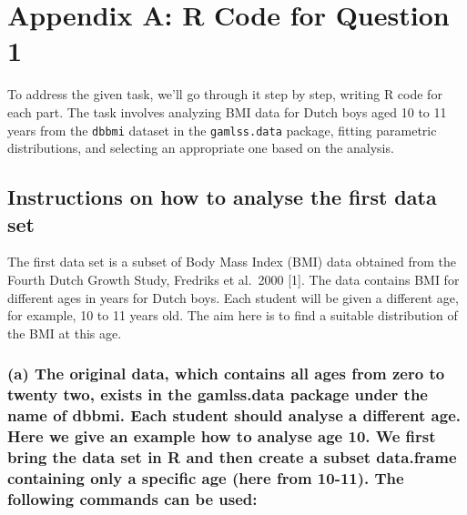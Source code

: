 \section{Appendix A: R Code for Question 1}

To address the given task, we'll go through it step by step, writing R
code for each part. The task involves analyzing BMI data for Dutch boys
aged 10 to 11 years from the \texttt{dbbmi} dataset in the
\texttt{gamlss.data} package, fitting parametric distributions, and
selecting an appropriate one based on the analysis.

\hypertarget{instructions-on-how-to-analyse-the-first-data-set}{%
\subsection{Instructions on how to analyse the first data
set}\label{instructions-on-how-to-analyse-the-first-data-set}}

The first data set is a subset of Body Mass Index (BMI) data obtained
from the Fourth Dutch Growth Study, Fredriks et al.~2000 {[}1{]}. The
data contains BMI for different ages in years for Dutch boys. Each
student will be given a different age, for example, 10 to 11 years old.
The aim here is to find a suitable distribution of the BMI at this age.

\hypertarget{a-the-original-data-which-contains-all-ages-from-zero-to-twenty-two-exists-in-the-gamlss.data-package-under-the-name-of-dbbmi.-each-student-should-analyse-a-different-age.-here-we-give-an-example-how-to-analyse-age-10.-we-first-bring-the-data-set-in-r-and-then-create-a-subset-data.frame-containing-only-a-specific-age-here-from-10-11.-the-following-commands-can-be-used}{%
\subsubsection{(a) The original data, which contains all ages from zero
to twenty two, exists in the gamlss.data package under the name of
dbbmi. Each student should analyse a different age. Here we give an
example how to analyse age 10. We first bring the data set in R and then
create a subset data.frame containing only a specific age (here from
10-11). The following commands can be
used:}\label{a-the-original-data-which-contains-all-ages-from-zero-to-twenty-two-exists-in-the-gamlss.data-package-under-the-name-of-dbbmi.-each-student-should-analyse-a-different-age.-here-we-give-an-example-how-to-analyse-age-10.-we-first-bring-the-data-set-in-r-and-then-create-a-subset-data.frame-containing-only-a-specific-age-here-from-10-11.-the-following-commands-can-be-used}}


